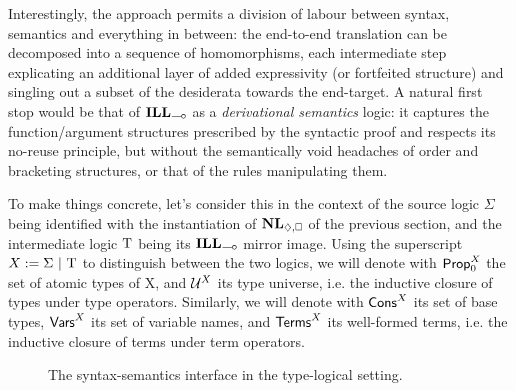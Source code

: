 Interestingly, the approach permits a division of labour between syntax, semantics and everything in between: the end-to-end translation can be decomposed into a sequence of homomorphisms, each intermediate step explicating an additional layer of added expressivity (or fortfeited structure) and singling out a subset of the desiderata towards the end-target.
A natural first stop would be that of $\ILL_{\li}$ as a \textit{derivational semantics} logic: it captures the function/argument structures prescribed by the syntactic proof and respects its no-reuse principle, but without the semantically void headaches of order and bracketing structures, or that of the rules manipulating them. 

To make things concrete, let's consider this in the context of the source logic $\Sigma$ being identified with the instantiation of $\NL_{\diamond,\bx}$ of the previous section, and the intermediate logic $\mathrm{T}$ being its $\ILL_{\li}$ mirror image.
Using the superscript $X := \Sigma \ | \ \Tau$ to distinguish between the two logics,
we will denote with $\mathsf{Prop}_0^X$ the set of atomic types of X, and $\mathcal{U}^X$ its type universe, i.e. the inductive closure of types under type operators.
Similarly, we will denote with $\mathsf{Cons}^{X}$ its set of base types, $\mathsf{Vars}^{X}$ its set of variable names, and $\mathsf{Terms}^{X}$ its well-formed terms, i.e. the inductive closure of terms under term operators.

\begin{figure}
	\centering
	\caption{The syntax-semantics interface in the type-logical setting.}
	\label{figure:synsemtlg}
\end{figure}

